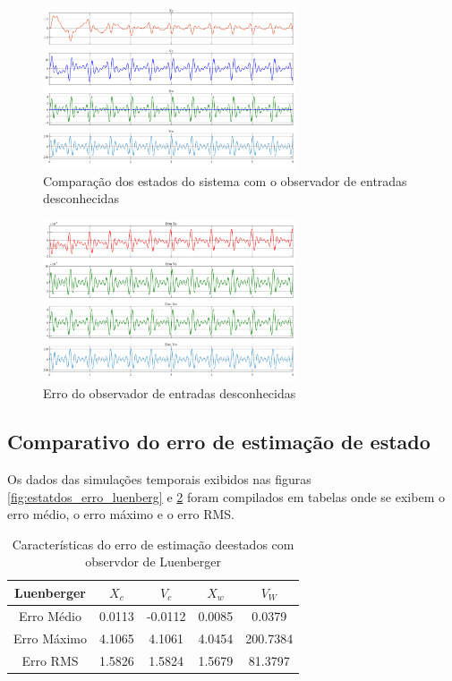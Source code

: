\FloatBarrier
\begin{figure}[htbp]
    \begin{centering}
    \includegraphics[width=7.5cm]{img/estatdos_UIO.png} 
    \caption{Comparação dos estados do sistema com o observador de entradas desconhecidas}
    \label{fig:estatdos_UIO}
    \end{centering}
\end{figure}
\FloatBarrier

\FloatBarrier
\begin{figure}[htbp]
    \begin{centering}
    \includegraphics[width=7.5cm]{img/estatdos_Erro_UIO.png} 
    \caption{Erro do observador de entradas desconhecidas}
    \label{fig:estatdos_erro_UIO}
    \end{centering}
\end{figure}
\FloatBarrier
\subsection{Comparativo do erro de estimação de estado}
Os dados das simulações temporais exibidos nas figuras \ref{fig:estatdos_erro_luenberg} e \ref{fig:estatdos_erro_UIO} foram compilados em tabelas onde se exibem o erro médio, o erro máximo e o erro RMS.
\begin{table}[h!]
\footnotesize
\centering
    \begin{tabular}{|c|c|c|c|c|}
        \hline
        Luenberger & $X_c$& $V_c$& $X_w$& $V_W$\\
        \hline
        \hline
         Erro Médio&  0.0113& -0.0112& 0.0085&   0.0379\\ 
         Erro Máximo& 4.1065&  4.1061& 4.0454& 200.7384\\ 
         Erro RMS&    1.5826&  1.5824& 1.5679&  81.3797\\
        \hline
    \end{tabular} \label{tb:comparacao_erro_estados}\caption{Características do erro de estimação deestados com observdor de Luenberger}
\end{table}

